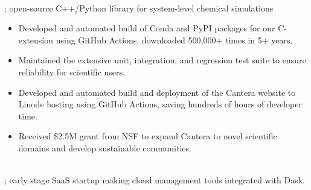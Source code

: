 \\
 ; open-source C++/Python library for system-level chemical simulations

\begin{itemize}
\item Developed and automated build of Conda and PyPI packages for our C-extension using GitHub Actions, downloaded 500,000+ times in 5+ years.
\item Maintained the extensive unit, integration, and regression test suite to ensure reliability for scientific users.
\item Developed and automated build and deployment of the Cantera website to Linode hosting using GitHub Actions, saving hundreds of hours of developer time.
\item Received \$2.5M grant from NSF to expand Cantera to novel scientific domains and develop sustainable communities.
\end{itemize}
\sectionsep

\\
; early stage SaaS startup making cloud management tools integrated with Dask.

